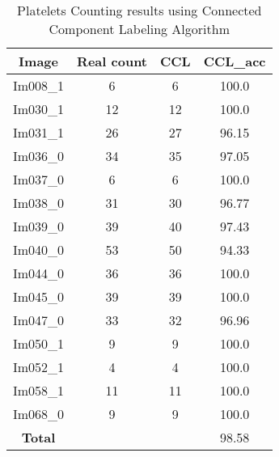 \begin{table}[H]
\centering
\begin{tabular}{|  c | c | c | c |}
\hline
\textbf{Image} & \textbf{Real count} & \textbf{CCL} & \textbf{CCL\_acc} \\
\hline
Im008\_1 & 6 & 6  & 100.0 \\
Im030\_1 & 12 & 12  & 100.0 \\
Im031\_1 & 26 & 27  & 96.15 \\
Im036\_0 & 34 & 35  & 97.05 \\
Im037\_0 & 6 & 6  & 100.0 \\
Im038\_0 & 31 & 30  & 96.77 \\
Im039\_0 & 39 & 40  & 97.43 \\
Im040\_0 & 53 & 50  & 94.33 \\
Im044\_0 & 36 & 36  & 100.0 \\
Im045\_0 & 39 & 39  & 100.0 \\
Im047\_0 & 33 & 32  & 96.96 \\
Im050\_1 & 9 & 9  & 100.0 \\
Im052\_1 & 4 & 4  & 100.0 \\
Im058\_1 & 11 & 11  & 100.0 \\
Im068\_0 & 9 & 9  & 100.0 \\
\hline
\textbf{Total} &  &  & 98.58\\
\hline
\end{tabular}
\caption{Platelets Counting results using Connected Component Labeling Algorithm}
\label{table:PLT_UNET_RESULT}
\end{table}
